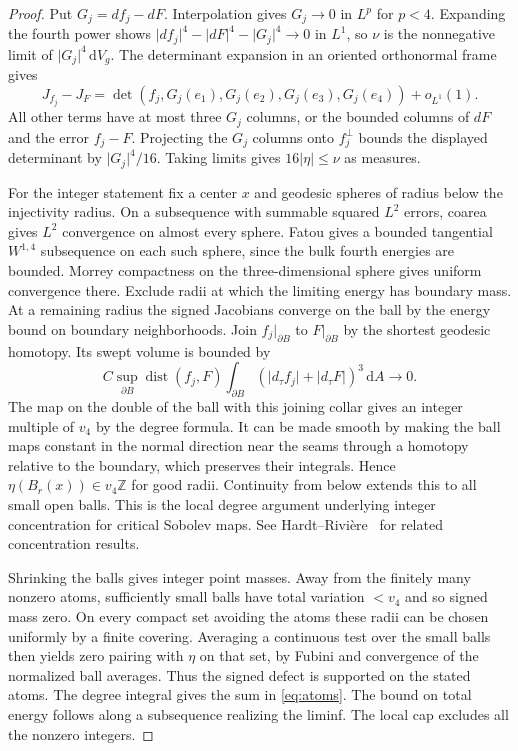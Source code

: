 \documentclass[11pt]{article}
\numberwithin{equation}{section}
\DeclareMathOperator{\dist}{dist}
\newcommand{\dd}{\mathrm{d}}
\newcommand{\abs}[1]{\lvert #1\rvert}
\newcommand{\dv}{\dd V_g}
\begin{document}
\begin{proof}
Put \(G_j=df_j-dF\). Interpolation gives \(G_j\to0\) in \(L^p\)
for \(p<4\). Expanding the fourth power shows
\(\abs{df_j}^4-\abs{dF}^4-\abs{G_j}^4\to0\) in \(L^1\),
so \(\nu\) is the nonnegative limit of \(\abs{G_j}^4\,\dv\).
The determinant expansion in an oriented orthonormal frame gives
\[
 J_{f_j}-J_F
 =\det(f_j,G_j(e_1),G_j(e_2),G_j(e_3),G_j(e_4))+o_{L^1}(1).
\]
All other terms have at most three \(G_j\) columns, or the bounded
columns of \(dF\) and the error \(f_j-F\).
Projecting the \(G_j\) columns onto \(f_j^\perp\) bounds the
displayed determinant by \(\abs{G_j}^4/16\). Taking limits
gives \(16\abs{\eta}\le\nu\) as measures.

For the integer statement fix a center \(x\) and geodesic spheres
of radius below the injectivity radius. On a subsequence with
summable squared \(L^2\) errors, coarea gives \(L^2\) convergence
on almost every sphere. Fatou gives a bounded tangential \(W^{1,4}\)
subsequence on each such sphere, since the bulk fourth energies are
bounded. Morrey compactness on the three-dimensional sphere gives
uniform convergence there. Exclude radii at which the limiting
energy has boundary mass. At a remaining radius the signed
Jacobians converge on the ball by the energy bound on boundary
neighborhoods. Join \(f_j|_{\partial B}\) to \(F|_{\partial B}\)
by the shortest geodesic homotopy. Its swept volume is bounded by
\[
 C\sup_{\partial B}\dist(f_j,F)
   \int_{\partial B}(\abs{d_\tau f_j}+\abs{d_\tau F})^3\,\dd A
 \longrightarrow 0 .
\]
The map on the double of the ball with this joining collar gives
an integer multiple of \(v_4\) by the degree formula. It can be
made smooth by making the ball maps constant in the normal
direction near the seams through a homotopy relative to the
boundary, which preserves their integrals. Hence
\(\eta(B_r(x))\in v_4\mathbb Z\) for good radii. Continuity from
below extends this to all small open balls. This is the local
degree argument underlying integer concentration for critical
Sobolev maps. See Hardt--Rivi\`ere~\cite{HardtRiviere2008Connecting}
for related concentration results.

Shrinking the balls gives integer point masses. Away from the
finitely many nonzero atoms, sufficiently small balls have total
variation \(<v_4\) and so signed mass zero. On every compact
set avoiding the atoms these radii can be chosen uniformly
by a finite covering. Averaging a continuous test over the small
balls then yields zero pairing with \(\eta\) on that set, by
Fubini and convergence of the normalized ball averages.
Thus the signed defect is supported on the stated atoms.
The degree integral gives the sum in \eqref{eq:atoms}.
The bound on total energy follows along a subsequence realizing
the liminf. The local cap excludes all the nonzero integers.
\end{proof}
\end{document}
